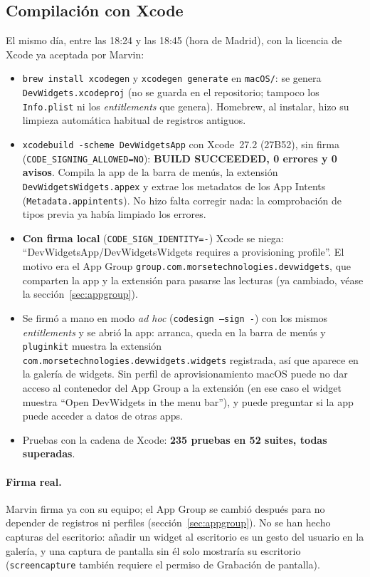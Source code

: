 \documentclass[11pt,a4paper]{article}
\begin{document}
\subsection{Compilación con Xcode}\label{sec:xcodebuild}
El mismo día, entre las 18:24 y las 18:45 (hora de Madrid), con la
licencia de Xcode ya aceptada por Marvin:
\begin{itemize}
  \item \texttt{brew install xcodegen} y \texttt{xcodegen generate}
    en \texttt{macOS/}: se genera \texttt{DevWidgets.xcodeproj} (no se
    guarda en el repositorio; tampoco los \texttt{Info.plist} ni los
    \emph{entitlements} que genera). Homebrew, al instalar, hizo su
    limpieza automática habitual de registros antiguos.
  \item \texttt{xcodebuild -scheme DevWidgetsApp} con Xcode~27.2
    (27B52), sin firma (\texttt{CODE\_SIGNING\_ALLOWED=NO}):
    \textbf{BUILD SUCCEEDED, 0 errores y 0 avisos}. Compila la app de
    la barra de menús, la extensión \texttt{DevWidgetsWidgets.appex}
    y extrae los metadatos de los App Intents
    (\texttt{Metadata.appintents}). No hizo falta corregir nada:
    la comprobación de tipos previa ya había limpiado los errores.
  \item \textbf{Con firma local} (\texttt{CODE\_SIGN\_IDENTITY=-})
    Xcode se niega: ``DevWidgetsApp/DevWidgetsWidgets requires a
    provisioning profile''. El motivo era el App Group
    \texttt{group.com.morsetechnologies.devwidgets}, que comparten la
    app y la extensión para pasarse las lecturas (ya cambiado, véase
    la sección~\ref{sec:appgroup}).
  \item Se firmó a mano en modo \emph{ad hoc} (\texttt{codesign
    --sign -}) con los mismos \emph{entitlements} y se abrió la app:
    arranca, queda en la barra de menús y \texttt{pluginkit} muestra
    la extensión \texttt{com.morsetechnologies.devwidgets.widgets}
    registrada, así que aparece en la galería de widgets. Sin perfil
    de aprovisionamiento macOS puede no dar acceso al contenedor del
    App Group a la extensión (en ese caso el widget muestra ``Open
    DevWidgets in the menu bar''), y puede preguntar si la app puede
    acceder a datos de otras apps.
  \item Pruebas con la cadena de Xcode: \textbf{235 pruebas en 52
    suites, todas superadas}.
\end{itemize}

\paragraph{Firma real.} Marvin firma ya con su equipo; el App Group
se cambió después para no depender de registros ni perfiles
(sección~\ref{sec:appgroup}). No se han hecho capturas del escritorio:
añadir un widget al escritorio es un gesto del usuario en la galería, y
una captura de pantalla sin él solo mostraría su escritorio
(\texttt{screencapture} también requiere el permiso de Grabación de
pantalla).
\end{document}
